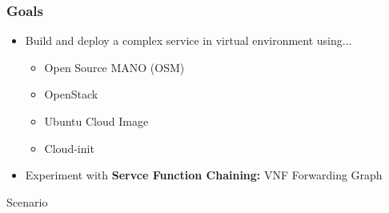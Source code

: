 \documentclass{beamer}
\begin{document}
{
\upbtitlebackground 
\begin{frame}
\titlepage %
\end{frame}
}



\begin{frame}
\frametitle{Goals}
\begin{itemize}
	\item Build and deploy a complex service in virtual environment using...
	\begin{itemize}
		\item Open Source MANO (OSM)
		\item OpenStack
		\item Ubuntu Cloud Image
		\item Cloud-init
	\end{itemize}	

	\item Experiment with \textbf{Servce Function Chaining:} VNF Forwarding Graph

\end{itemize}
\end{frame}


\begin{frame}
\Huge{\centerline{Scenario}}
\end{frame}
\end{document}
